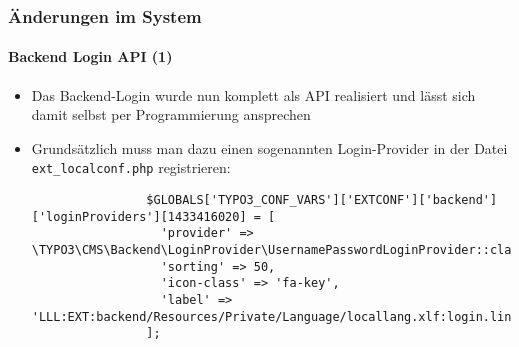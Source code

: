 
\begin{frame}[fragile]
	\frametitle{Änderungen im System}
	\framesubtitle{Backend Login API (1)}

	\lstset{basicstyle=\tiny\ttfamily}

	\begin{itemize}

		\item Das Backend-Login wurde nun komplett als API realisiert und lässt
			sich damit selbst per Programmierung ansprechen

		\item Grundsätzlich muss man dazu einen sogenannten Login-Provider in
			der Datei \texttt{ext\_localconf.php} registrieren:

			\begin{lstlisting}
				$GLOBALS['TYPO3_CONF_VARS']['EXTCONF']['backend']['loginProviders'][1433416020] = [
				  'provider' => \TYPO3\CMS\Backend\LoginProvider\UsernamePasswordLoginProvider::class,
				  'sorting' => 50,
				  'icon-class' => 'fa-key',
				  'label' => 'LLL:EXT:backend/Resources/Private/Language/locallang.xlf:login.link'
				];
			\end{lstlisting}

	\end{itemize}

\end{frame}



